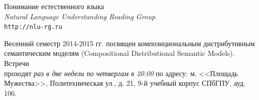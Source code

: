 \documentclass[12pt]{article}
\begin{document}
\baselineskip 15pt

\parindent 0cm


\begin{center}
{\rm \Huge{Понимание естественного языка}}\\
\medskip
{\rm \Large \textit{Natural Language Understanding Reading Group}}\\
\medskip
{\rm \Large \texttt{http://nlu-rg.ru}}
\end{center}

\bigskip

\baselineskip 12pt

\begin{spacing}{1.15}
Весенний семестр 2014-2015 гг. посвящен композициональным дистрибутивным \\семантическим моделям (Compositional Distributional Semantic Models). Встречи \\проходят \textit{раз в две недели по четвергам в 20:00} по адресу: м. <<Площадь Мужества>>, Политехническая ул., д. 21, 9-й учебный корпус СПбГПУ, ауд. 106.
\end{spacing}

\end{document}
